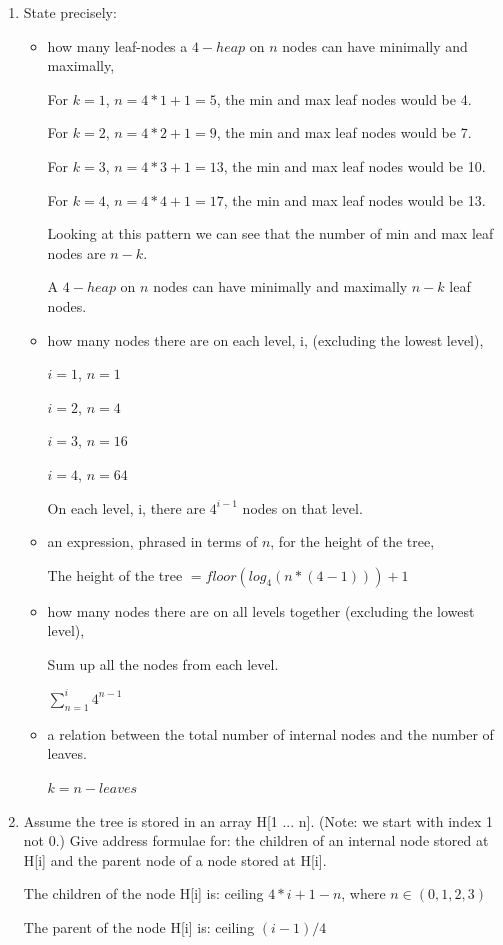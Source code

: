 \documentclass[11pt]{article}
\begin{document}
 \begin{enumerate}
\item State precisely:
 	\begin{itemize}
 		\item
 		how many leaf-nodes a $4-heap$ on $n$ nodes can have minimally and maximally,

		For $k = 1$, $n=4*1 + 1 = 5$, the min and max leaf nodes would be 4.

		For $k = 2$, $n=4*2 + 1 = 9$, the min and max leaf nodes would be 7.

		For $k = 3$, $n=4*3 + 1 = 13$, the min and max leaf nodes would be 10.

		For $k = 4$, $n=4*4 + 1 = 17$, the min and max leaf nodes would be 13.

		Looking at this pattern we can see that the number of min and max leaf nodes are $n-k$.

		A $4-heap$ on $n$ nodes can have minimally and maximally $n-k$ leaf nodes.

 		\item 
 		how many nodes there are on each level, i,  (excluding the lowest level),

		$i = 1$, $n = 1$

		$i = 2$, $n = 4$

		$i = 3$, $n = 16$

		$i = 4$, $n = 64$

		On each level, i, there are $4^{i-1}$ nodes on that level.

 		\item   an expression, phrased in terms of $n$, for the height of the tree,
 		
		The height of the tree $= floor(log_4 (n*(4-1))) + 1$

 		\item
 		how many nodes there are on all levels  together (excluding the lowest level),

		Sum up all the nodes from each level.

		$\sum_{n=1}^{i} 4^{n-1}$

 		\item
 		a relation between  the total number of internal nodes and the number of leaves.

		$k = n - leaves$
 		
 	\end{itemize}

	\item Assume the tree is stored in an array H[1 ... n]. (Note: we start with index 1 not 0.) Give address formulae for: the children of an internal node stored at H[i] and the parent node of a node stored at H[i].
	
	The children of the node H[i] is: ceiling $4*i+1-n$, where $n \in ({0,1,2,3})$

	The parent of the node H[i] is: ceiling $(i-1)/4$
	
\end{enumerate}
\end{document}
